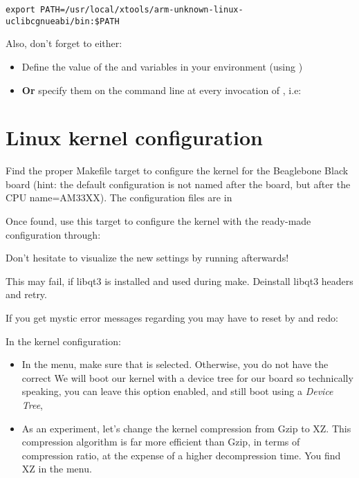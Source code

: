 \begin{verbatim}
export PATH=/usr/local/xtools/arm-unknown-linux-uclibcgnueabi/bin:$PATH
\end{verbatim}

Also, don't forget to either:

\begin{itemize}
\item Define the value of the  and 
  variables in your environment (using )
\item {\bf Or} specify them on the command line at every invocation of
  , i.e: 
\end{itemize}

\section{Linux kernel configuration}

Find the proper Makefile target to configure the kernel for the Beaglebone Black board 
(hint: the default configuration is not named after the board, but after the CPU
name=AM33XX). The configuration files are in 

Once found, use this target to configure the kernel with the
ready-made configuration through:


Don't hesitate to visualize the new settings by running
 afterwards!

This may fail, if libqt3 is installed and used during make.
Deinstall libqt3 headers and retry.

If you get mystic error messages regarding 
you may have to reset by  and redo:


In the kernel configuration:

\begin{itemize}

\item In the  menu, make sure that  is selected.
  Otherwise, you do not have the correct 
  We will boot our kernel with a device tree for our board so
  technically speaking, you can leave this option enabled,
  and still boot using a {\em Device Tree}, 

\item As an experiment, let's change the kernel compression from Gzip
  to XZ. This compression algorithm is far more efficient than Gzip,
  in terms of compression ratio, at the expense of a higher
  decompression time. You find XZ in the  menu.

\end{itemize}

